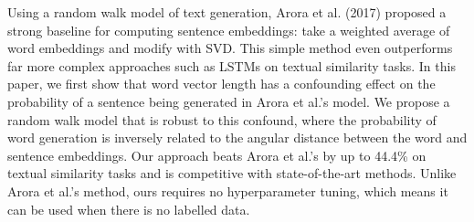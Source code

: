 Using a random walk model of text generation, Arora et al. (2017) proposed a strong baseline for computing sentence embeddings: take a weighted average of word embeddings and modify with SVD. This simple method even outperforms far more complex approaches such as LSTMs on textual similarity tasks. In this paper, we first show that word vector length has a confounding effect on the probability of a sentence being generated in Arora et al.'s model. We propose a random walk model that is robust to this confound, where the probability of word generation is inversely related to the angular distance between the word and sentence embeddings. Our approach beats Arora et al.'s by up to 44.4\% on textual similarity tasks and is competitive with state-of-the-art methods. Unlike Arora et al.'s method, ours requires no hyperparameter tuning, which means it can be used when there is no labelled data.
